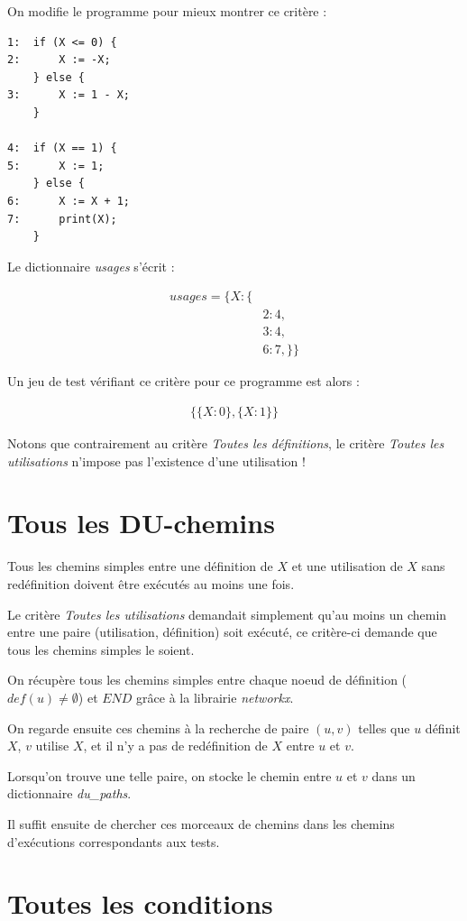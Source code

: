 \documentclass[a4paper, 12pt]{report}
\begin{document}
On modifie le programme pour mieux montrer ce critère :
\begin{verbatim}
1:  if (X <= 0) {
2:      X := -X;
    } else {
3:      X := 1 - X;
    }

4:  if (X == 1) {
5:      X := 1;
    } else {
6:      X := X + 1;
7: 		print(X);
    }
\end{verbatim}

Le dictionnaire \textit{usages} s'écrit :

\begin{align*}
usages = \{
			X : \{ &\\
		&2 : 4, \\
		&3 : 4, \\
		&6 : 7,	\}\}
\end{align*}

Un jeu de test vérifiant ce critère pour ce programme est alors :

\begin{align*}
\{
	\{ X : 0 \},
	\{ X : 1 \}
\}
\end{align*}

Notons que contrairement au critère \textit{Toutes les définitions}, le critère \textit{Toutes les utilisations} n'impose pas l'existence d'une utilisation !

\section{Tous les DU-chemins}

Tous les chemins simples entre une définition de $X$ et une utilisation de $X$ sans redéfinition doivent être exécutés au moins une fois.

Le critère \textit{Toutes les utilisations} demandait simplement qu'au moins un chemin entre une paire (utilisation, définition) soit exécuté, ce critère-ci demande que tous les chemins simples le soient.

On récupère tous les chemins simples entre chaque noeud de définition ($def(u) \neq \emptyset$) et $END$ grâce à la librairie \textit{networkx}.

On regarde ensuite ces chemins à la recherche de paire $(u, v)$ telles que $u$ définit $X$, $v$ utilise $X$, et il n'y a pas de redéfinition de $X$ entre $u$ et $v$.

Lorsqu'on trouve une telle paire, on stocke le chemin entre $u$ et $v$ dans un dictionnaire \textit{du\_paths}.

Il suffit ensuite de chercher ces morceaux de chemins dans les chemins d'exécutions correspondants aux tests.
\section{Toutes les conditions}
\end{document}
